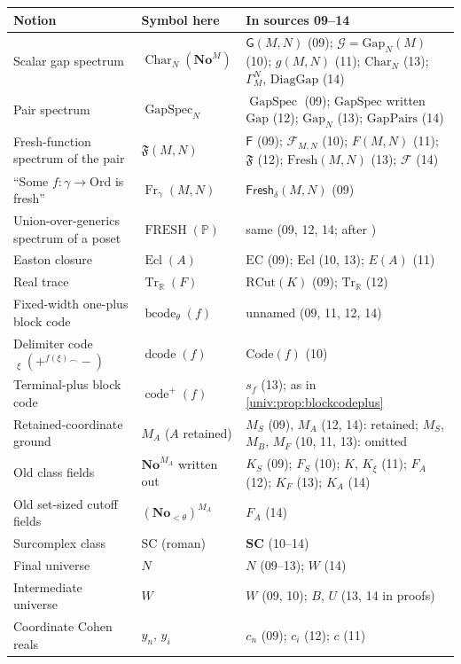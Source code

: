 \documentclass[11pt,letterpaper]{article}
\numberwithin{equation}{section}
\theoremstyle{definition}
\theoremstyle{remark}
\newcommand{\No}{\mathbf{No}}
\newcommand{\SC}{\mathrm{SC}}
\newcommand{\NoM}{\No^{M}}
\newcommand{\Ord}{\mathrm{Ord}}
\newcommand{\R}{\mathbb R}
\newcommand{\GapSpec}{\operatorname{GapSpec}}
\newcommand{\codeplus}{\operatorname{code}^{+}}
\newcommand{\cat}{\mathbin{{}^{\frown}}}
\newcommand{\Char}{\operatorname{Char}}
\newcommand{\FF}{\mathfrak F}
\newcommand{\Fr}{\operatorname{Fr}}
\newcommand{\FRESH}{\operatorname{FRESH}}
\newcommand{\Ecl}{\operatorname{Ecl}}
\newcommand{\Tr}{\operatorname{Tr}_{\R}}
\newcommand{\dcode}{\operatorname{dcode}}
\newcommand{\bcode}{\operatorname{bcode}}
\begin{document}
\begin{center}\small
\begin{longtable}{@{}P{0.3\textwidth}P{0.19\textwidth}P{0.43\textwidth}@{}}
\toprule
Notion & Symbol here & In sources 09--14\\
\midrule
\endhead
Scalar gap spectrum & $\Char_N(\NoM)$ & $\mathsf G(M,N)$ (09); $\mathcal G=\mathrm{Gap}_N(M)$ (10); $g(M,N)$ (11); $\mathrm{Char}_N$ (13); $\Gamma^N_M$, $\mathrm{DiagGap}$ (14)\\
Pair spectrum & $\GapSpec_N$ & $\GapSpec$ (09); $\mathrm{GapSpec}$ written $\mathrm{Gap}$ (12); $\mathrm{Gap}_N$ (13); $\mathrm{GapPairs}$ (14)\\
Fresh-function spectrum of the pair & $\FF(M,N)$ & $\mathsf F$ (09); $\mathcal F_{M,N}$ (10); $F(M,N)$ (11); $\mathfrak F$ (12); $\mathrm{Fresh}(M,N)$ (13); $\mathcal F$ (14)\\
``Some $f:\gamma\to\Ord$ is fresh'' & $\Fr_\gamma(M,N)$ & $\mathsf{Fresh}_\delta(M,N)$ (09)\\
Union-over-generics spectrum of a poset & $\FRESH(\mathbb P)$ & same (09, 12, 14; after \cite{FKW})\\
Easton closure & $\Ecl(A)$ & $\mathrm{EC}$ (09); $\mathrm{Ecl}$ (10, 13); $E(A)$ (11)\\
Real trace & $\Tr(F)$ & $\mathrm{RCut}(K)$ (09); $\mathrm{Tr}_{\R}$ (12)\\
Fixed-width one-plus block code & $\bcode_\theta(f)$ & unnamed (09, 11, 12, 14)\\
Delimiter code $\mathop{\cat}_\xi(+^{f(\xi)}\cat-)$ & $\dcode(f)$ & $\mathrm{Code}(f)$ (10)\\
Terminal-plus block code & $\codeplus(f)$ & $s_f$ (13); as in \cref{univ:prop:blockcodeplus}\\
Retained-coordinate ground & $M_A$ ($A$ retained) & $M_S$ (09), $M_A$ (12, 14): retained; $M_S$, $M_B$, $M_F$ (10, 11, 13): omitted\\
Old class fields & $\No^{M_A}$ written out & $K_S$ (09); $F_S$ (10); $K$, $K_\xi$ (11); $F_A$ (12); $K_F$ (13); $K_A$ (14)\\
Old set-sized cutoff fields & $(\No_{<\theta})^{M_A}$ & $F_A$ (14)\\
Surcomplex class & $\SC$ (roman) & $\mathbf{SC}$ (10--14)\\
Final universe & $N$ & $N$ (09--13); $W$ (14)\\
Intermediate universe & $W$ & $W$ (09, 10); $B$, $U$ (13, 14 in proofs)\\
Coordinate Cohen reals & $y_n$, $y_i$ & $c_n$ (09); $c_i$ (12); $c$ (11)\\

\end{longtable}
\end{center}
\end{document}
